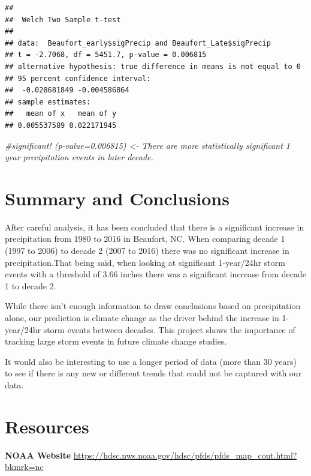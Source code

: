 \documentclass[
  12pt,
]{article}
\newenvironment{Shaded}{\begin{snugshade}}{\end{snugshade}}
\newcommand{\CommentTok}[1]{\textcolor[rgb]{0.56,0.35,0.01}{\textit{#1}}}
\begin{document}
\begin{verbatim}
## 
##  Welch Two Sample t-test
## 
## data:  Beaufort_early$sigPrecip and Beaufort_Late$sigPrecip
## t = -2.7068, df = 5451.7, p-value = 0.006815
## alternative hypothesis: true difference in means is not equal to 0
## 95 percent confidence interval:
##  -0.028681849 -0.004586864
## sample estimates:
##   mean of x   mean of y 
## 0.005537589 0.022171945
\end{verbatim}

\begin{Shaded}
\begin{Highlighting}[]
\CommentTok{\#significant! (p{-}value=0.006815) \textless{}{-} There are more statistically significant 1 year precipitation events in later decade. }
\end{Highlighting}
\end{Shaded}

\newpage

\hypertarget{summary-and-conclusions}{%
\section{Summary and Conclusions}\label{summary-and-conclusions}}

After careful analysis, it has been concluded that there is a
significant increase in precipitation from 1980 to 2016 in Beaufort, NC.
When comparing decade 1 (1997 to 2006) to decade 2 (2007 to 2016) there
was no significant increase in precipitation.That being said, when
looking at significant 1-year/24hr storm events with a threshold of 3.66
inches there was a significant increase from decade 1 to decade 2.

While there isn't enough information to draw conclusions based on
precipitation alone, our prediction is climate change as the driver
behind the increase in 1-year/24hr storm events between decades. This
project shows the importance of tracking large storm events in future
climate change studies.

It would also be interesting to use a longer period of data (more than
30 years) to see if there is any new or different trends that could not
be captured with our data.

\newpage

\hypertarget{resources}{%
\section{Resources}\label{resources}}

\textbf{NOAA Website}
\url{https://hdsc.nws.noaa.gov/hdsc/pfds/pfds_map_cont.html?bkmrk=nc}
\end{document}
